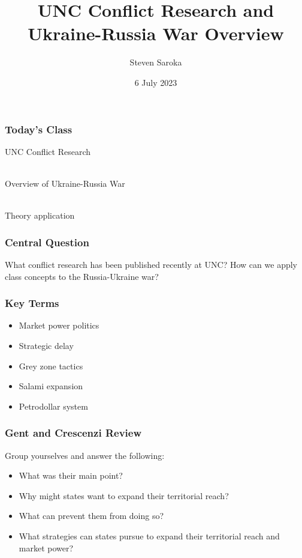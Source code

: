\documentclass{beamer}
\title[UNC Conflict Research]{\LARGE{UNC Conflict Research and Ukraine-Russia War Overview}}
\author[POLI 150]{Steven Saroka}
\institute{POLI 150}
\date{6 July 2023}
\begin{document}
	
	\begin{frame}
		\titlepage %
	\end{frame}
	
	
	
	
	\begin{frame} 
		\frametitle{\LARGE{Today's Class}}
		\begin{itemize}
			\Large{
				\item UNC Conflict Research
				\\~\\
				\item Overview of Ukraine-Russia War
				\\~\\ 
				\item Theory application}
		\end{itemize}
	\end{frame}
	
\begin{frame} 
	\frametitle{\LARGE{Central Question}}
	\centering
	\Large{What conflict research has been published recently at UNC? How can we apply class concepts to the Russia-Ukraine war?}
\end{frame}

\begin{frame} 
	\frametitle{\LARGE{Key Terms}}
	\begin{itemize}
		\item Market power politics
		\item Strategic delay
		\item Grey zone tactics
		\item Salami expansion
		\item Petrodollar system
	\end{itemize}
\end{frame}

\begin{frame} 
	\frametitle{\LARGE{Gent and Crescenzi Review}}
	Group yourselves and answer the following:
	\begin{itemize}
		\item What was their main point?
		\item Why might states want to expand their territorial reach?
		\item What can prevent them from doing so?
		\item What strategies can states pursue to expand their territorial reach and market power?
	\end{itemize}
\end{frame}
\end{document}
